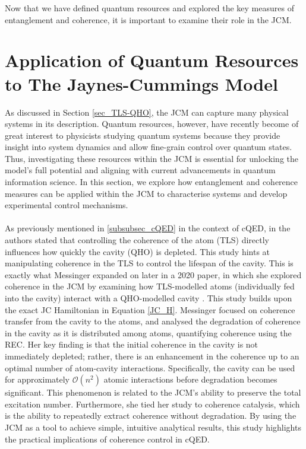 \documentclass[12pt,a4paper]{article}
\begin{document}
Now that we have defined quantum resources and explored the key measures of entanglement and coherence, it is important to examine their role in the JCM.


\section{Application of Quantum Resources to The Jaynes-Cummings Model} \label{sec_QRes_app}

As discussed in Section \ref{sec_TLS-QHO}, the JCM can capture many physical systems in its description. Quantum resources, however, have recently become of great interest to physicists studying quantum systems because they provide insight into system dynamics and allow fine-grain control over quantum states. Thus, investigating these resources within the JCM is essential for unlocking the model's full potential and aligning with current advancements in quantum information science. In this section, we explore how entanglement and coherence measures can be applied within the JCM to characterise systems and develop experimental control mechanisms. \\
\\
As previously mentioned in \ref{subsubsec_cQED} in the context of cQED, in \cite{QResJCm2004-cQED_coherence}the authors stated that controlling the coherence of the atom (TLS) directly influences how quickly the cavity (QHO) is depleted. This study hints at manipulating coherence in the TLS to control the lifespan of the cavity. This is exactly what Messinger expanded on later in a 2020 paper, in which she explored coherence in the JCM by examining how TLS-modelled atoms (individually fed into the cavity) interact with a QHO-modelled cavity \cite{CohEnt2020-Cavity_controlled_coherence}. This study builds upon the exact JC Hamiltonian in Equation \eqref{JC_H}. Messinger focused on coherence transfer from the cavity to the atoms, and analysed the degradation of coherence in the cavity as it is distributed among atoms, quantifying coherence using the REC. Her key finding is that the initial coherence in the cavity is not immediately depleted; rather, there is an enhancement in the coherence up to an optimal number of atom-cavity interactions. Specifically, the cavity can be used for approximately $\mathcal{O}(n^2)$ atomic interactions before degradation becomes significant. This phenomenon is related to the JCM's ability to preserve the total excitation number. Furthermore, she tied her study to coherence catalysis, which is the ability to repeatedly extract coherence without degradation. By using the JCM as a tool to achieve simple, intuitive analytical results, this study highlights the practical implications of coherence control in cQED.\\
\end{document}
